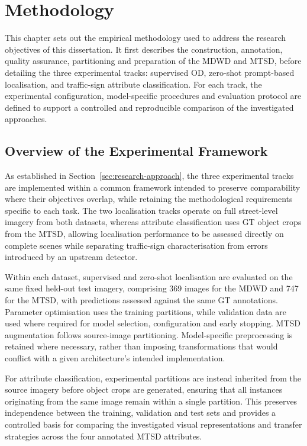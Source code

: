 \chapter{Methodology}
\label{ch:methodology}
This chapter sets out the empirical methodology used to address the research objectives of this dissertation. It first describes the construction, annotation, quality assurance, partitioning and preparation of the \gls{MDWD} and \gls{MTSD}, before detailing the three experimental tracks: supervised \gls{OD}, zero-shot prompt-based localisation, and traffic-sign attribute classification. For each track, the experimental configuration, model-specific procedures and evaluation protocol are defined to support a controlled and reproducible comparison of the investigated approaches.

\section{Overview of the Experimental Framework}
\label{sec:md-overview}
As established in Section~\ref{sec:research-approach}, the three experimental tracks are implemented within a common framework intended to preserve comparability where their objectives overlap, while retaining the methodological requirements specific to each task. The two localisation tracks operate on full street-level imagery from both datasets, whereas attribute classification uses \gls{GT} object crops from the \gls{MTSD}, allowing localisation performance to be assessed directly on complete scenes while separating traffic-sign characterisation from errors introduced by an upstream detector.

Within each dataset, supervised and zero-shot localisation are evaluated on the same fixed held-out test imagery, comprising 369 images for the \gls{MDWD} and 747 for the \gls{MTSD}, with predictions assessed against the same \gls{GT} annotations. Parameter optimisation uses the training partitions, while validation data are used where required for model selection, configuration and early stopping. MTSD augmentation follows source-image partitioning. Model-specific preprocessing is retained where necessary, rather than imposing transformations that would conflict with a given architecture's intended implementation.

For attribute classification, experimental partitions are instead inherited from the source imagery before object crops are generated, ensuring that all instances originating from the same image remain within a single partition. This preserves independence between the training, validation and test sets and provides a controlled basis for comparing the investigated visual representations and transfer strategies across the four annotated \gls{MTSD} attributes.

